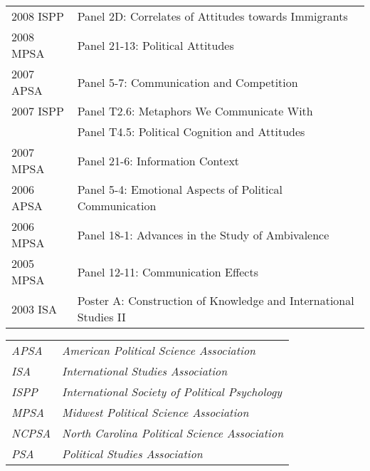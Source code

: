 \documentclass[12pt]{article}
\begin{document}
\begin{longtable}{@{}p{3.5cm}@{}l}
            2008 ISPP & {Panel 2D: Correlates of Attitudes towards Immigrants}\\
            
            2008 MPSA & {Panel 21-13: Political Attitudes}\\
            
            2007 APSA & {Panel 5-7: Communication and Competition}\\
            
            2007 ISPP & {Panel T2.6: Metaphors We Communicate With}\\
            
            & {Panel T4.5: Political Cognition and Attitudes}\\
            
            2007 MPSA & {Panel 21-6: Information Context}\\
            
            2006 APSA & {Panel 5-4: Emotional Aspects of 
            Political Communication}\\
            
            2006 MPSA & {Panel 18-1: Advances in the Study of Ambivalence}\\
            
            2005 MPSA & {Panel 12-11: Communication Effects}\\
            
            2003 ISA & {Poster A: Construction of 
            Knowledge and International Studies II}\\

\end{longtable}
		
\vspace*{.25cm}

\begin{longtable}{@{}p{3.5cm}@{}l}%
\textit{APSA} & \textit{American Political Science Association}\\
\textit{ISA} & \textit{International Studies Association}\\
\textit{ISPP} & \textit{International Society of Political Psychology}\\
\textit{MPSA} & \textit{Midwest Political Science Association}\\
\textit{NCPSA} & \textit{North Carolina Political Science Association}\\
\textit{PSA} & \textit{Political Studies Association}\\
\end{longtable}
\end{document}
